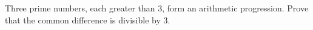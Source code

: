 Three prime numbers, each greater than $3$, form an arithmetic progression. Prove that the common difference is divisible by $3$.
